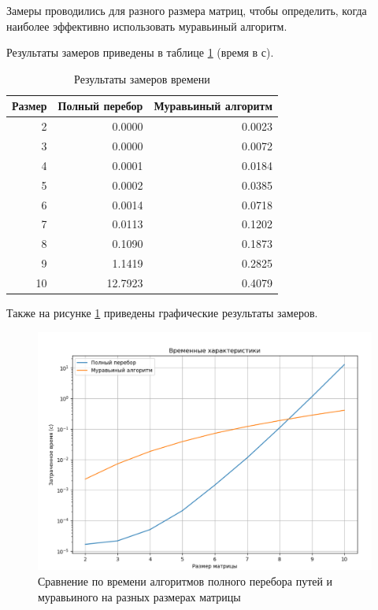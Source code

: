 Замеры проводились для разного размера матриц, чтобы определить, когда наиболее эффективно использовать муравьиный алгоритм.

Результаты замеров приведены в таблице \ref{tbl:time_mes} (время в с).


\begin{center}
\captionsetup{justification=raggedright,singlelinecheck=off}
\begin{longtable}[c]{|r|r|r|}
\caption{Результаты замеров времени\label{tbl:time_mes}}\\ \hline
    Размер & Полный перебор & Муравьиный алгоритм \\ \hline
        2 &     0.0000 &     0.0023 \\ \hline
        3 &     0.0000 &     0.0072 \\ \hline
        4 &     0.0001 &     0.0184 \\ \hline
        5 &     0.0002 &     0.0385 \\ \hline
        6 &     0.0014 &     0.0718 \\ \hline
        7 &     0.0113 &     0.1202 \\ \hline
        8 &     0.1090 &     0.1873 \\ \hline
        9 &     1.1419 &     0.2825 \\ \hline
        10 &    12.7923 &     0.4079 \\ \hline
        
\end{longtable}
\end{center}
\clearpage


Также на рисунке \ref{fig:graph} приведены графические результаты замеров.

\begin{figure}[h!]
	\centering
	\includegraphics[width=0.95\linewidth]{img/graph}
	\caption{Сравнение по времени алгоритмов полного перебора путей и муравьиного на разных размерах матрицы}
	\label{fig:graph}
\end{figure}


